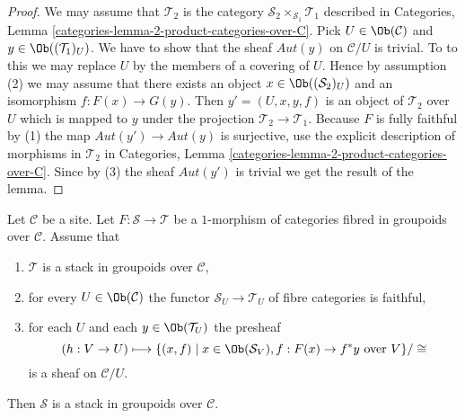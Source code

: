 \begin{proof}
We may assume that $\mathcal{T}_2$ is the category
$\mathcal{S}_2 \times_{\mathcal{S}_1} \mathcal{T}_1$
described in
Categories, Lemma \ref{categories-lemma-2-product-categories-over-C}.
Pick $U \in \Ob(\mathcal{C})$ and
$y \in \Ob((\mathcal{T}_1)_U)$.
We have to show that the sheaf $\mathit{Aut}(y)$ on $\mathcal{C}/U$
is trivial. To to this we may replace $U$ by the members of
a covering of $U$. Hence by assumption (2) we may assume that
there exists an object $x \in \Ob((\mathcal{S}_2)_U)$
and an isomorphism $f : F(x) \to G(y)$.
Then $y' = (U, x, y, f)$ is an object of $\mathcal{T}_2$ over $U$
which is mapped to $y$ under the projection $\mathcal{T}_2 \to \mathcal{T}_1$.
Because $F$ is fully faithful by (1) the map
$\mathit{Aut}(y') \to \mathit{Aut}(y)$ is surjective, use the explicit
description of morphisms in $\mathcal{T}_2$ in
Categories, Lemma \ref{categories-lemma-2-product-categories-over-C}.
Since by (3) the sheaf $\mathit{Aut}(y')$ is trivial
we get the result of the lemma.
\end{proof}

\begin{lemma}
\label{lemma-relative-sheaf-over-stack-is-stack}
Let $\mathcal{C}$ be a site. Let $F : \mathcal{S} \to \mathcal{T}$
be a $1$-morphism of categories fibred in groupoids over $\mathcal{C}$.
Assume that
\begin{enumerate}
\item $\mathcal{T}$ is a stack in groupoids over $\mathcal{C}$,
\item for every $U \in \Ob(\mathcal{C})$ the functor
$\mathcal{S}_U \to \mathcal{T}_U$ of fibre categories is faithful,
\item for each $U$ and each $y \in \Ob(\mathcal{T}_U)$ the presheaf
$$
(h : V \to U)
\longmapsto
\{(x, f) \mid x \in \Ob(\mathcal{S}_V), f : F(x) \to f^*y\text{ over }V\}/\cong
$$
is a sheaf on $\mathcal{C}/U$.
\end{enumerate}
Then $\mathcal{S}$ is a stack in groupoids over $\mathcal{C}$.
\end{lemma}

